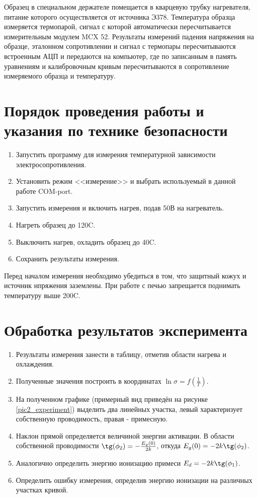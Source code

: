 Образец в специальном держателе помещается в кварцевую трубку нагревателя, питание которого осуществляется от источника Э378. Температура образца измеряется термопарой, сигнал с которой автоматически пересчитывается измерительным модулем MCX 52. Результаты измерений падения напряжения на образце, эталонном сопротивлении и сигнал с термопары пересчитываются встроенным АЦП и передаются на компьютер, где по записанным в память уравнениям и калибровочным кривым пересчитываются в сопротивление измеряемого образца и температуру.

\section{Порядок проведения работы и указания по технике безопасности}

\begin{enumerate}
\item Запустить программу для измерения температурной зависимости электросопротивления.
\item Установить режим <<измерение>> и выбрать используемый в данной работе COM-port.
\item Запустить измерения и включить нагрев, подав 50В на нагреватель.
\item Нагреть образец до 120\textdegree C.
\item Выключить нагрев, охладить образец до 40\textdegree C.
\item Сохранить результаты измерения.
\end{enumerate}

Перед началом измерения необходимо убедиться в том, что защитный кожух и источник нпряжения заземлены. При работе с печью запрещается поднимать температуру выше 200\textdegree C.

\section{Обработка результатов эксперимента}

\begin{enumerate}
\item Результаты измерения занести в таблицу, отметив области нагрева и охлаждения.
\item Полученные значения построить в координатах $\ln \sigma = f \left( \frac{1}{T} \right)$.
\item На полученном графике (примерный вид приведён на рисунке \ref{pic2_experiment}) выделить два линейных участка, левый характеризует собственную проводимость, правая - примесную.
\item Наклон прямой определяется величиной энергии активации. В области собственной проводимости $\tg (\phi_{2}) = -\frac{E_{g}(0)}{2 k}$, откуда $E_{g}(0) = -2 k \tg(\phi_{2})$.
\item Аналогично определить энергию ионизацию примеси $E_{d} = -2 k \tg(\phi_{1})$.\
\item Определить ошибку измерения, определив энергию ионизации на различных участках кривой.
\end{enumerate}

